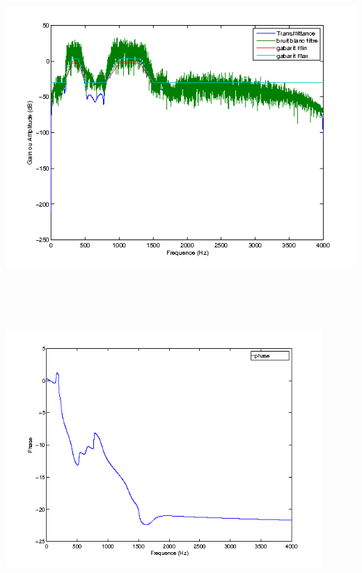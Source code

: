 \documentclass{article}
\begin{document}
\inputminted[linenos,lastline=25]{matlab}{RII_Cheby2.m}
\includegraphics[height=13cm]{cheb2_1}
\inputminted[linenos,firstnumber=29,firstline=29,lastline=29]{matlab}{RII_Cheby2.m}
\includegraphics[height=9cm]{cheb2_2}
\inputminted[linenos,firstnumber=34,firstline=34,lastline=42]{matlab}{RII_Cheby2.m}
\end{document}
